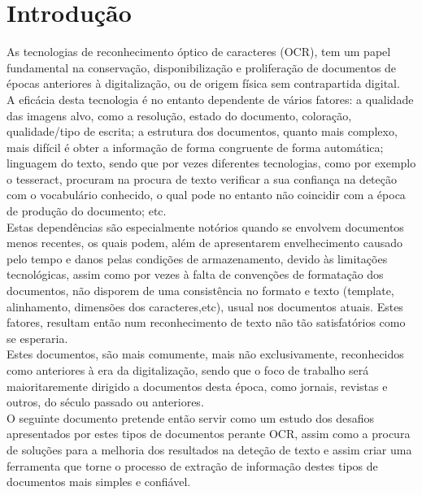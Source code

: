 \chapter{Introdução}


As tecnologias de reconhecimento óptico de caracteres (OCR), tem um papel fundamental na conservação, disponibilização e proliferação de documentos de épocas anteriores à digitalização, ou de origem física sem contrapartida digital. \\
A eficácia desta tecnologia é no entanto dependente de vários fatores: a qualidade das imagens alvo, como a resolução, estado do documento, coloração, qualidade/tipo de escrita; a estrutura dos documentos, quanto mais complexo, mais difícil é obter a informação de forma congruente de forma automática; linguagem do texto, sendo que por vezes diferentes tecnologias, como por exemplo o tesseract, procuram na procura de texto verificar a sua confiança na deteção com o vocabulário conhecido, o qual pode no entanto não coincidir com a época de produção do documento; etc. \\
Estas dependências são especialmente notórios quando se envolvem documentos menos recentes, os quais podem, além de apresentarem envelhecimento causado pelo tempo e danos pelas condições de armazenamento, devido às limitações tecnológicas, assim como por vezes à falta de convenções de formatação dos documentos, não disporem de uma consistência no formato e texto (template, alinhamento, dimensões dos caracteres,etc), usual nos documentos atuais. Estes fatores, resultam então num reconhecimento de texto não tão satisfatórios como se esperaria. \\
Estes documentos, são mais comumente, mais não exclusivamente, reconhecidos como anteriores à era da digitalização, sendo que o foco de trabalho será maioritaremente dirigido a documentos desta época, como jornais, revistas e outros, do século passado ou anteriores. \\
O seguinte documento pretende então servir como um estudo dos desafios apresentados por estes tipos de documentos perante OCR, assim como a procura de soluções para a melhoria dos resultados na deteção de texto e assim criar uma ferramenta que torne o processo de extração de informação destes tipos de documentos mais simples e confiável. \\
